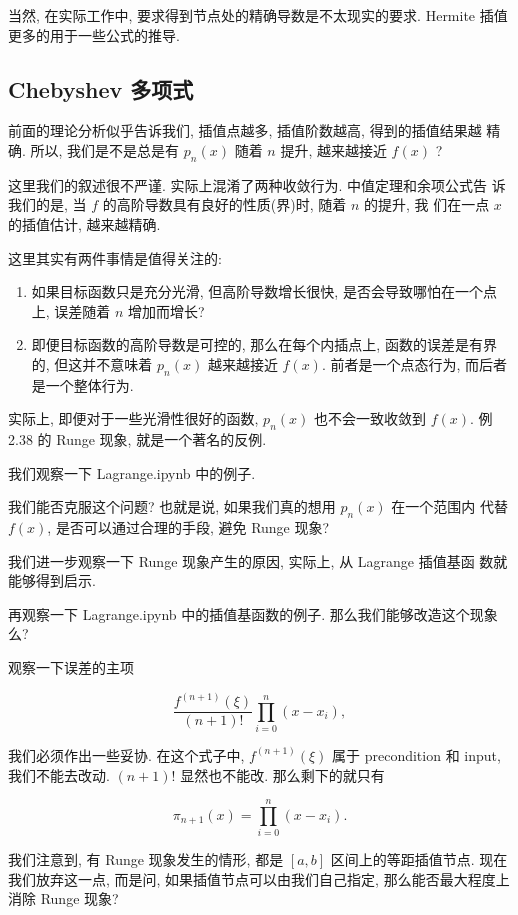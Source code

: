 \documentclass[a4paper]{ctexart}
\begin{document}
当然, 在实际工作中, 要求得到节点处的精确导数是不太现实的要求. Hermite 插值
更多的用于一些公式的推导.

\subsection{Chebyshev 多项式}

前面的理论分析似乎告诉我们, 插值点越多, 插值阶数越高, 得到的插值结果越
精确. 所以, 我们是不是总是有 $p_n(x)$ 随着 $n$ 提升, 越来越接近 $f(x)$ ?

这里我们的叙述很不严谨. 实际上混淆了两种收敛行为. 中值定理和余项公式告
诉我们的是, 当 $f$ 的高阶导数具有良好的性质(界)时, 随着 $n$ 的提升, 我
们在一点 $x$ 的插值估计, 越来越精确.

这里其实有两件事情是值得关注的:
\begin{enumerate}
  \item 如果目标函数只是充分光滑, 但高阶导数增长很快, 是否会导致哪怕在一个点上, 
  误差随着 $n$ 增加而增长?
  \item 即便目标函数的高阶导数是可控的, 那么在每个内插点上, 函数的误差是有界的, 
  但这并不意味着 $p_n(x)$ 越来越接近 $f(x)$. 前者是一个点态行为, 
  而后者是一个整体行为. 
\end{enumerate}

实际上, 即便对于一些光滑性很好的函数, 
$p_n(x)$ 也不会一致收敛到 $f(x)$. 例 2.38 的 Runge 现象, 就是一个著名的反例.

我们观察一下 Lagrange.ipynb 中的例子.

我们能否克服这个问题? 也就是说, 如果我们真的想用 $p_n(x)$ 在一个范围内
代替 $f(x)$, 是否可以通过合理的手段, 避免 Runge 现象?

我们进一步观察一下 Runge 现象产生的原因, 实际上, 从 Lagrange 插值基函
数就能够得到启示. 

再观察一下 Lagrange.ipynb 中的插值基函数的例子. 那么我们能够改造这个现象么?

观察一下误差的主项

$$
\frac{f^{(n + 1)}(\xi)}{(n + 1)!}\prod_{i = 0}^n(x - x_i),
$$

我们必须作出一些妥协. 在这个式子中, $f^{(n + 1)}(\xi)$ 属于
precondition 和 input, 我们不能去改动. $(n + 1)!$ 显然也不能改. 
那么剩下的就只有

$$
\pi_{n + 1}(x) = \prod_{i = 0}^n(x - x_i).
$$

我们注意到, 有 Runge 现象发生的情形, 
都是 $[a, b]$ 区间上的等距插值节点. 现在我们放弃这一点, 而是问, 
如果插值节点可以由我们自己指定, 那么能否最大程度上消除 Runge 现象? 
\end{document}
